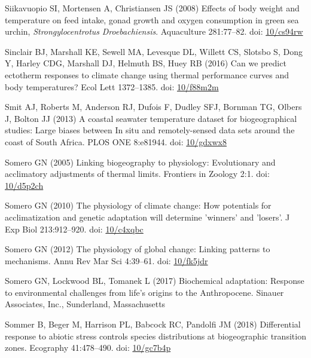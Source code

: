\documentclass[a4paper,10pt, oneside]{memoir}
\begin{document}
\leavevmode\hypertarget{ref-Siikavuopio2008}{}%
Siikavuopio SI, Mortensen A, Christiansen JS (2008) Effects of body weight and temperature on feed intake, gonad growth and oxygen consumption in green sea urchin, \emph{Strongylocentrotus} \emph{Droebachiensis}. Aquaculture 281:77--82. doi: \href{https://doi.org/10/cs94rw}{10/cs94rw}

\leavevmode\hypertarget{ref-Sinclair2016}{}%
Sinclair BJ, Marshall KE, Sewell MA, Levesque DL, Willett CS, Slotsbo S, Dong Y, Harley CDG, Marshall DJ, Helmuth BS, Huey RB (2016) Can we predict ectotherm responses to climate change using thermal performance curves and body temperatures? Ecol Lett 1372--1385. doi: \href{https://doi.org/10/f88m2m}{10/f88m2m}

\leavevmode\hypertarget{ref-Smit2013}{}%
Smit AJ, Roberts M, Anderson RJ, Dufois F, Dudley SFJ, Bornman TG, Olbers J, Bolton JJ (2013) A coastal seawater temperature dataset for biogeographical studies: Large biases between In situ and remotely-sensed data sets around the coast of South Africa. PLOS ONE 8:e81944. doi: \href{https://doi.org/10/gdxwx8}{10/gdxwx8}

\leavevmode\hypertarget{ref-Somero2005}{}%
Somero GN (2005) Linking biogeography to physiology: Evolutionary and acclimatory adjustments of thermal limits. Frontiers in Zoology 2:1. doi: \href{https://doi.org/10/d5p2ch}{10/d5p2ch}

\leavevmode\hypertarget{ref-Somero2010}{}%
Somero GN (2010) The physiology of climate change: How potentials for acclimatization and genetic adaptation will determine 'winners' and 'losers'. J Exp Biol 213:912--920. doi: \href{https://doi.org/10/c4xqbc}{10/c4xqbc}

\leavevmode\hypertarget{ref-Somero2012}{}%
Somero GN (2012) The physiology of global change: Linking patterns to mechanisms. Annu Rev Mar Sci 4:39--61. doi: \href{https://doi.org/10/fk5jdr}{10/fk5jdr}

\leavevmode\hypertarget{ref-Somero2017}{}%
Somero GN, Lockwood BL, Tomanek L (2017) Biochemical adaptation: Response to environmental challenges from life's origins to the Anthropocene. Sinauer Associates, Inc., Sunderland, Massachusetts

\leavevmode\hypertarget{ref-Sommer2018}{}%
Sommer B, Beger M, Harrison PL, Babcock RC, Pandolfi JM (2018) Differential response to abiotic stress controls species distributions at biogeographic transition zones. Ecography 41:478--490. doi: \href{https://doi.org/10/gc7b4p}{10/gc7b4p}
\end{document}
